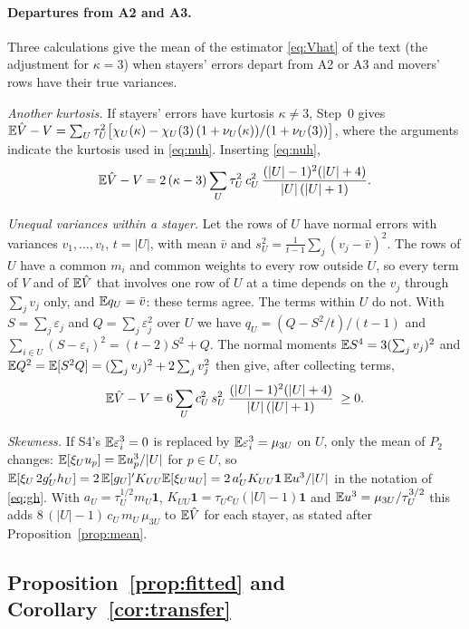 \paragraph{Departures from A2 and A3.} Three calculations give the mean of the estimator \eqref{eq:Vhat} of the
text (the adjustment for $\kappa=3$) when stayers' errors depart from A2 or A3 and movers' rows have their true
variances.

\emph{Another kurtosis.} If stayers' errors have kurtosis $\kappa\ne3$, Step~0 gives
$\mathbb{E}\hat V-V=\sum_U\tau_U^2\big[\chi_U(\kappa)-\chi_U(3)\,(1+\nu_U(\kappa))/(1+\nu_U(3))\big]$, where the arguments
indicate the kurtosis used in \eqref{eq:nuh}. Inserting \eqref{eq:nuh},
\begin{equation}\label{eq:kurt}
\mathbb{E}\hat V-V=2\,(\kappa-3)\sum_U\tau_U^2\,c_U^2\,\frac{(|U|-1)^2(|U|+4)}{|U|\,(|U|+1)} .
\end{equation}

\emph{Unequal variances within a stayer.} Let the rows of $U$ have normal errors with variances $v_1,\dots,v_t$,
$t=|U|$, with mean $\bar v$ and $s_U^2=\frac{1}{t-1}\sum_j(v_j-\bar v)^2$. The rows of $U$ have a common $m_i$ and
common weights to every row outside $U$, so every term of $V$ and of $\mathbb{E}\hat V$ that involves one row of $U$ at a
time depends on the $v_j$ through $\sum_jv_j$ only, and $\mathbb{E} q_U=\bar v$: these terms agree. The terms within $U$ do
not. With $S=\sum_j\varepsilon_j$ and $Q=\sum_j\varepsilon_j^2$ over $U$ we have $q_U=(Q-S^2/t)/(t-1)$ and
$\sum_{i\in U}(S-\varepsilon_i)^2=(t-2)S^2+Q$. The normal moments $\mathbb{E} S^4=3(\sum_jv_j)^2$ and
$\mathbb{E} Q^2=\mathbb{E}[S^2Q]=(\sum_jv_j)^2+2\sum_jv_j^2$ then give, after collecting terms,
\begin{equation}\label{eq:uneq}
\mathbb{E}\hat V-V=6\sum_Uc_U^2\,s_U^2\,\frac{(|U|-1)^2(|U|+4)}{|U|\,(|U|+1)}\;\ge0 .
\end{equation}

\emph{Skewness.} If S4's $\mathbb{E}\varepsilon_i^3=0$ is replaced by $\mathbb{E}\varepsilon_i^3=\mu_{3U}$ on $U$,
only the mean of $P_2$ changes: $\mathbb{E}[\xi_Uu_p]=\mathbb{E} u_p^3/|U|$ for $p\in U$, so
$\mathbb{E}[\xi_U\,2g_U'h_U]=2\,\mathbb{E}[g_U]'K_{UU}\mathbb{E}[\xi_Uu_U]=2\,a_U'K_{UU}\mathbf{1}\,\mathbb{E} u^3/|U|$ in the notation of
\eqref{eq:gh}. With $a_U=\tau_U^{1/2}m_U\mathbf{1}$, $K_{UU}\mathbf{1}=\tau_Uc_U(|U|-1)\mathbf{1}$ and
$\mathbb{E} u^3=\mu_{3U}/\tau_U^{3/2}$ this adds $8\,(|U|-1)\,c_U\,m_U\,\mu_{3U}$ to $\mathbb{E}\hat V$ for each stayer, as stated
after Proposition~\ref{prop:mean}.

\subsection{Proposition~\ref{prop:fitted} and Corollary~\ref{cor:transfer}}

